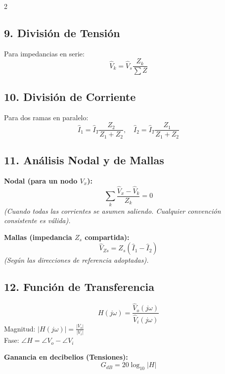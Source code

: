\documentclass[10pt, a4paper]{article}
\begin{document}
\begin{multicols*}{2}
\subsection*{9. División de Tensión}
Para impedancias en serie:
\begin{equation*}
    \boxed{\hat{V}_k = \hat{V}_s \frac{Z_k}{\sum Z}}
\end{equation*}

\subsection*{10. División de Corriente}
Para dos ramas en paralelo:
\begin{equation*}
    \boxed{\hat{I}_1 = \hat{I}_T \frac{Z_2}{Z_1 + Z_2}}, \quad \boxed{\hat{I}_2 = \hat{I}_T \frac{Z_1}{Z_1 + Z_2}}
\end{equation*}

\subsection*{11. Análisis Nodal y de Mallas}
\textbf{Nodal (para un nodo $V_x$):}
\begin{equation*}
    \boxed{\sum_k \frac{\hat{V}_x - \hat{V}_k}{Z_k} = 0}
\end{equation*}
\textit{(Cuando todas las corrientes se asumen saliendo. Cualquier convención consistente es válida).}

\vspace{0.2cm}
\textbf{Mallas (impedancia $Z_s$ compartida):}
\begin{equation*}
    \boxed{\hat{V}_{Zs} = Z_s(\hat{I}_1 - \hat{I}_2)}
\end{equation*}
\textit{(Según las direcciones de referencia adoptadas).}

\subsection*{12. Función de Transferencia}
\begin{equation*}
    \boxed{H(j\omega) = \frac{\hat{V}_o(j\omega)}{\hat{V}_i(j\omega)}}
\end{equation*}
Magnitud: $\boxed{|H(j\omega)| = \frac{|V_o|}{|V_i|}}$ \\
Fase: $\boxed{\angle H = \angle V_o - \angle V_i}$

\vspace{0.2cm}
\textbf{Ganancia en decibelios (Tensiones):}
\begin{equation*}
    \boxed{G_{dB} = 20\log_{10}|H|}
\end{equation*}


\end{multicols*}
\end{document}
